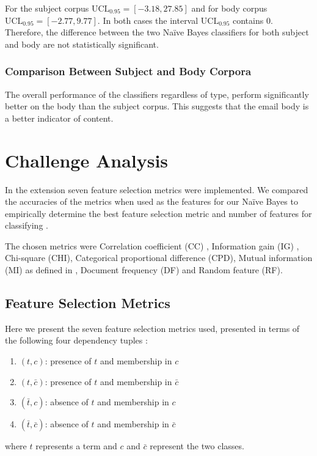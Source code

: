 \documentclass[10pt, a4paper]{article}
\begin{document}
For the subject corpus $\text{UCL}_{0.95} = [-3.18, 27.85]$ and for body corpus $\text{UCL}_{0.95} = [-2.77, 9.77]$. In both cases the interval $\text{UCL}_{0.95}$ contains 0. Therefore, the difference between the two Na\"ive Bayes classifiers for both subject and body are not statistically significant.

\subsubsection{Comparison Between Subject and Body Corpora}

The overall performance of the classifiers regardless of type, perform significantly better on the body than the subject corpus. This suggests that the email body is a better indicator of content.

\section{Challenge Analysis}


In the extension seven feature selection metrics were implemented. We compared the accuracies of the metrics when used as the features for our Na\"ive Bayes to empirically determine the best feature selection metric and number of features for classifying \cite{lingspam}.

The chosen metrics were Correlation coefficient (CC) \cite{CC}, Information gain (IG) \cite{IG}, Chi-square (CHI), Categorical proportional difference (CPD), Mutual information (MI) as defined in \cite{CPD}, Document frequency (DF) and Random feature (RF).

\subsection{Feature Selection Metrics}
Here we present the seven feature selection metrics used, presented in terms of the following four dependency tuples \cite{IG}:
\begin{enumerate}
\item $(t,c)$: presence of $t$ and membership in $c$
\item $(t,\bar{c})$: presence of $t$ and membership in $\bar{c}$
\item $(\bar{t},c)$: absence of $t$ and membership in $c$
\item $(\bar{t},\bar{c})$: absence of $t$ and membership in $\bar{c}$
\end{enumerate}
where $t$ represents a term and $c$ and $\bar{c}$ represent the two classes.
\end{document}
